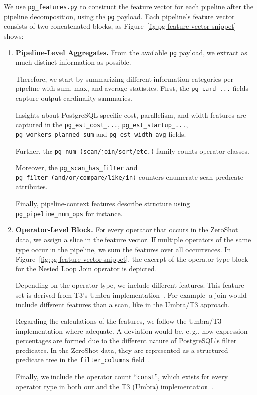 We use \texttt{pg\_features.py} to construct the feature vector for each pipeline after the pipeline decomposition, using the \texttt{pg} payload.
Each pipeline's feature vector consists of two concatenated blocks, as Figure~\ref{fig:pg-feature-vector-snippet} shows:

\begin{enumerate}
  \item \textbf{Pipeline-Level Aggregates.}
  From the available \texttt{pg} payload, we extract as much distinct information as possible.

  Therefore, we start by summarizing different information categories per pipeline with sum, max, and average statistics.
  First, the \texttt{pg\_card\_...} fields capture output cardinality summaries.

  Insights about PostgreSQL-specific cost, parallelism, and width features are captured in the
  \texttt{pg\_est\_cost\_...},
  \texttt{pg\_est\_startup\_...},
  \texttt{pg\_workers\_planned\_sum}
  and \texttt{pg\_est\_width\_avg} fields.

  Further, the \texttt{pg\_num\_(scan/join/sort/etc.)} family counts operator classes.

  Moreover, the \texttt{pg\_scan\_has\_filter}
  and \texttt{pg\_filter\_(and/or/compare/like/in)} counters enumerate scan predicate attributes.

  Finally, pipeline-context features describe structure using
  \texttt{pg\_pipeline\_num\_ops} for instance.
  \item \textbf{Operator-Level Block.}
  For every operator that occurs in the ZeroShot data, we assign a slice in the feature vector.
  If multiple operators of the same type occur in the pipeline, we sum the features over all occurrences.
  In Figure~\ref{fig:pg-feature-vector-snippet}, the excerpt of the operator-type block for the Nested Loop Join operator is depicted.

  Depending on the operator type, we include different features. This feature set is derived from T3's Umbra implementation~\parencite{t3}.
  For example, a join would include different features than a scan, like in the Umbra/T3 approach.

  Regarding the calculations of the features, we follow the Umbra/T3 implementation where adequate.
  A deviation would be, e.\,g., how expression percentages are formed due to the different nature of PostgreSQL's filter predicates.
  In the ZeroShot data, they are represented as a structured predicate tree in the \texttt{filter\_columns} field~\parencite{zeroshot}.

  Finally, we include the operator count ``\texttt{const}'', which exists for every operator type in both our and the T3 (Umbra) implementation~\parencite{t3}.
\end{enumerate}

